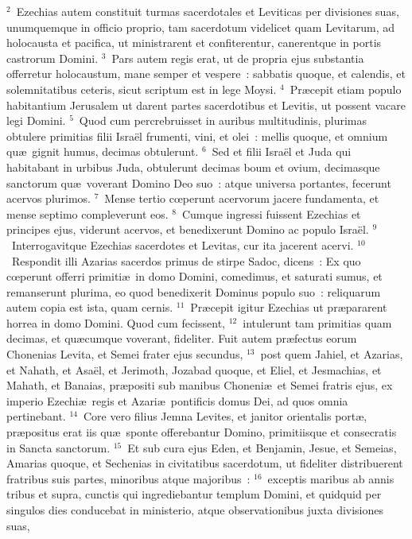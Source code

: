 ${}^{2}$~Ezechias autem constituit turmas sacerdotales et Leviticas per divisiones suas, unumquemque in officio proprio, tam sacerdotum videlicet quam Levitarum, ad holocausta et pacifica, ut ministrarent et confiterentur, canerentque in portis castrorum Domini.
${}^{3}$~Pars autem regis erat, ut de propria ejus substantia offerretur holocaustum, mane semper et vespere~: sabbatis quoque, et calendis, et solemnitatibus ceteris, sicut scriptum est in lege Moysi.
${}^{4}$~Pr\ae cepit etiam populo habitantium Jerusalem ut darent partes sacerdotibus et Levitis, ut possent vacare legi Domini.
${}^{5}$~Quod cum percrebruisset in auribus multitudinis, plurimas obtulere primitias filii Isra\"el frumenti, vini, et olei~: mellis quoque, et omnium qu\ae\ gignit humus, decimas obtulerunt.
${}^{6}$~Sed et filii Isra\"el et Juda qui habitabant in urbibus Juda, obtulerunt decimas boum et ovium, decimasque sanctorum qu\ae\ voverant Domino Deo suo~: atque universa portantes, fecerunt acervos plurimos.
${}^{7}$~Mense tertio cœperunt acervorum jacere fundamenta, et mense septimo compleverunt eos.
${}^{8}$~Cumque ingressi fuissent Ezechias et principes ejus, viderunt acervos, et benedixerunt Domino ac populo Isra\"el.
${}^{9}$~Interrogavitque Ezechias sacerdotes et Levitas, cur ita jacerent acervi.
${}^{10}$~Respondit illi Azarias sacerdos primus de stirpe Sadoc, dicens~: Ex quo cœperunt offerri primiti\ae\ in domo Domini, comedimus, et saturati sumus, et remanserunt plurima, eo quod benedixerit Dominus populo suo~: reliquarum autem copia est ista, quam cernis.
${}^{11}$~Pr\ae cepit igitur Ezechias ut pr\ae pararent horrea in domo Domini. Quod cum fecissent,
${}^{12}$~intulerunt tam primitias quam decimas, et qu\ae cumque voverant, fideliter. Fuit autem pr\ae fectus eorum Chonenias Levita, et Semei frater ejus secundus,
${}^{13}$~post quem Jahiel, et Azarias, et Nahath, et Asa\"el, et Jerimoth, Jozabad quoque, et Eliel, et Jesmachias, et Mahath, et Banaias, pr\ae positi sub manibus Choneni\ae\ et Semei fratris ejus, ex imperio Ezechi\ae\ regis et Azari\ae\ pontificis domus Dei, ad quos omnia pertinebant.
${}^{14}$~Core vero filius Jemna Levites, et janitor orientalis port\ae , pr\ae positus erat iis qu\ae\ sponte offerebantur Domino, primitiisque et consecratis in Sancta sanctorum.
${}^{15}$~Et sub cura ejus Eden, et Benjamin, Jesue, et Semeias, Amarias quoque, et Sechenias in civitatibus sacerdotum, ut fideliter distribuerent fratribus suis partes, minoribus atque majoribus~:
${}^{16}$~exceptis maribus ab annis tribus et supra, cunctis qui ingrediebantur templum Domini, et quidquid per singulos dies conducebat in ministerio, atque observationibus juxta divisiones suas,
